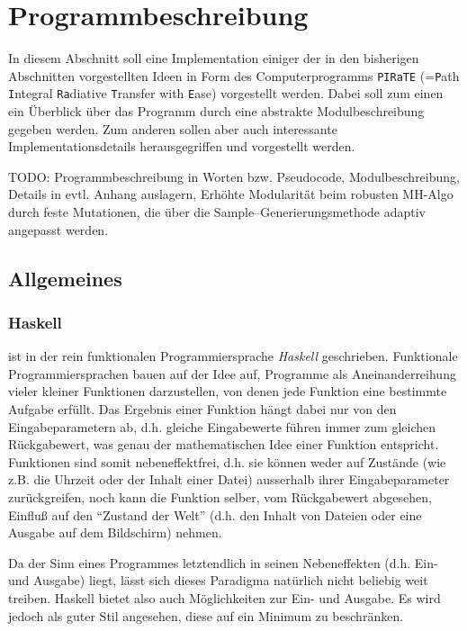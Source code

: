 	\chapter{Programmbeschreibung}\label{cha:program_description}
	In diesem Abschnitt soll eine Implementation einiger der in den bisherigen Abschnitten vorgestellten Ideen in Form des Computerprogramms \texttt{PIRaTE} (=\texttt{P}ath \texttt{I}ntegral \texttt{Ra}diative \texttt{T}ransfer with \texttt{E}ase) vorgestellt werden. Dabei soll zum einen ein Überblick über das Programm durch eine abstrakte Modulbeschreibung gegeben werden. Zum anderen sollen aber auch interessante Implementationsdetails herausgegriffen und vorgestellt werden.
	
	TODO: Programmbeschreibung in Worten bzw. Pseudocode, Modulbeschreibung, Details in evtl. Anhang auslagern, Erhöhte Modularität beim robusten MH-Algo durch feste Mutationen, die über die Sample--Generierungsmethode adaptiv angepasst werden.
	
	\section{Allgemeines}
	\subsection{Haskell}
	\pirate ist in der rein funktionalen Programmiersprache {\em Haskell} geschrieben. Funktionale Programmiersprachen bauen auf der Idee auf, Programme als Aneinanderreihung vieler kleiner Funktionen darzustellen, von denen jede Funktion eine bestimmte Aufgabe erfüllt. Das Ergebnis einer Funktion hängt dabei nur von den Eingabeparametern ab, d.h. gleiche Eingabewerte führen immer zum gleichen Rückgabewert, was genau der mathematischen Idee einer Funktion entspricht. Funktionen sind somit nebeneffektfrei, d.h. sie können weder auf Zustände (wie z.B. die Uhrzeit oder der Inhalt einer Datei) ausserhalb ihrer Eingabeparameter zurückgreifen, noch kann die Funktion selber, vom Rückgabewert abgesehen, Einfluß auf den ``Zustand der Welt'' (d.h. den Inhalt von Dateien oder eine Ausgabe auf dem Bildschirm) nehmen.
	
	Da der Sinn eines Programmes letztendlich in seinen Nebeneffekten (d.h. Ein- und Ausgabe) liegt, lässt sich dieses Paradigma natürlich nicht beliebig weit treiben. Haskell bietet also auch Möglichkeiten zur Ein- und Ausgabe. Es wird jedoch als guter Stil angesehen, diese auf ein Minimum zu beschränken.
	
